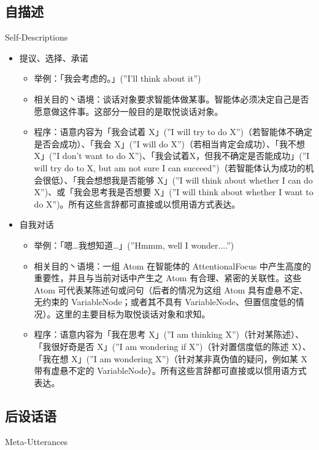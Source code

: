 \subsection{自描述}{Self-Descriptions}

\begin{itemize}

\item 提议、选择、承诺
\begin{itemize}
\item 举例：「我会考虑的。」(”I’ll think about it”)
\item 相关目的丶语境：谈话对象要求智能体做某事。智能体必须决定自己是否愿意做这件事。这部分一般目的是取悦谈话对象。
\item 程序：语意内容为「我会试着 X」(”I will try to do X”)（若智能体不确定是否会成功）、「我会 X」(”I will do X”)（若相当肯定会成功）、「我不想 X」(”I don’t want to do X”)、「我会试着X，但我不确定是否能成功」(”I will try do to X, but am not sure I can succeed”)（若智能体认为成功的机会很低）、「我会想想我是否能够 X」(”I will think about whether I can do X”)、或「我会思考我是否想要 X」(”I will think about whether I want to do X”)。所有这些言辞都可直接或以惯用语方式表达。
\end{itemize}


\item 自我对话
\begin{itemize}
\item 举例：「嗯…我想知道…」(”Hmmm, well I wonder....”)
\item 相关目的丶语境：一组 Atom 在智能体的 AttentionalFocus 中产生高度的重要性，并且与当前对话中产生之 Atom 有合理、紧密的关联性。这些 Atom 可代表某陈述句或问句（后者的情况为这组 Atom 具有虚悬不定、无约束的 VariableNode；或者其不具有 VariableNode、但置信度低的情况）。这里的主要目标为取悦谈话对象和求知。 
\item 程序：语意内容为「我在思考 X」(”I am thinking X”)（针对某陈述）、「我很好奇是否 X」(”I am wondering if X”)（针对置信度低的陈述 X）、「我在想 X」(”I am wondering X”)（针对某非真伪值的疑问，例如某 X 带有虚悬不定的 VariableNode）。所有这些言辞都可直接或以惯用语方式表达。
\end{itemize}

\end{itemize}

\subsection{后设话语}{Meta-Utterances}


